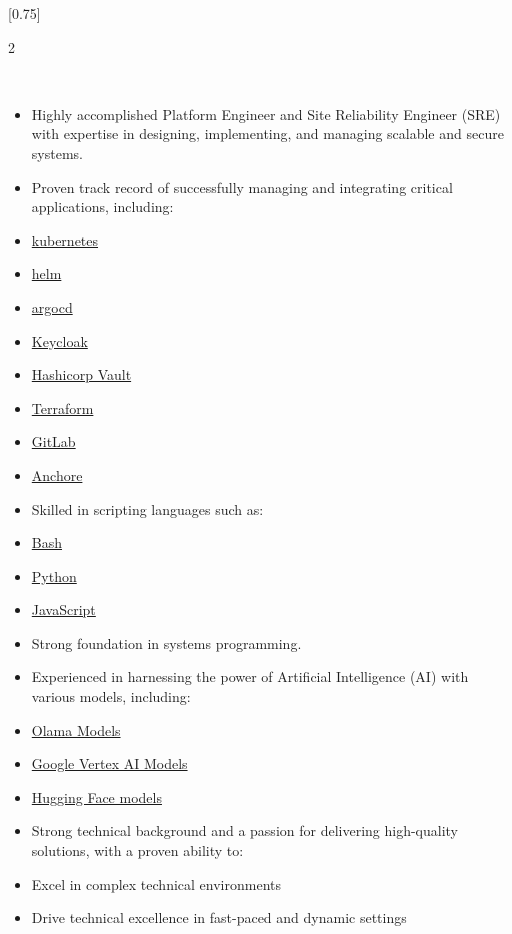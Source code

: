 \documentclass[lighthipster]{simplehipstercv}
\begin{document}
\setlength{\columnsep}{1.5cm}
[0.75]
\begin{paracol}{2}

\paracolbackgroundoptions



\footnotesize
{\setasidefontcolour
\flushright
\begin{center}
\end{center}

\\[0.5em]
\begin{itemize}
\item Highly accomplished Platform Engineer and Site Reliability Engineer (SRE) with expertise in designing, implementing, and managing scalable and secure systems.
\item Proven track record of successfully managing and integrating critical applications, including:
\item \href{https://kubernetes.io/}{kubernetes}
\item \href{https://helm.sh/}{helm}
\item \href{https://argo-cd.readthedocs.io/en/stable/}{argocd}
\item \href{https://www.keycloak.org/}{Keycloak}
\item \href{https://www.hashicorp.com/products/vault}{Hashicorp Vault}
\item \href{https://www.terraform.io/}{Terraform}
\item \href{https://gitlab.com/}{GitLab}
\item \href{https://anchore.com/}{Anchore}
\item Skilled in scripting languages such as:
\item \href{https://www.gnu.org/software/bash/}{Bash}
\item \href{https://www.python.org/}{Python}
\item \href{https://www.javascript.com/}{JavaScript}
\item Strong foundation in systems programming.
\item Experienced in harnessing the power of Artificial Intelligence (AI) with various models, including:
\item \href{https://olam.ai/}{Olama Models}
\item \href{https://cloud.google.com/vertex-ai}{Google Vertex AI Models}
\item \href{https://huggingface.co/}{Hugging Face models}
\item Strong technical background and a passion for delivering high-quality solutions, with a proven ability to:
\item Excel in complex technical environments
\item Drive technical excellence in fast-paced and dynamic settings
\end{itemize}
{\footnotesize

}}
\end{paracol}
\end{document}
